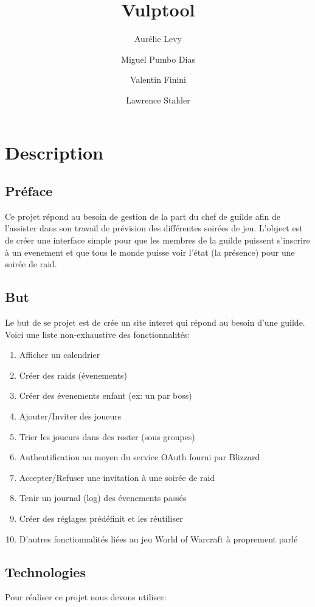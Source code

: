 \documentclass[a4paper, 11pt]{article}
\title{Vulptool}
\author{Aurélie Levy \and Miguel Pumbo Dias \and Valentin Finini \and Lawrence Stalder}
\begin{document}
\maketitle

\section{Description}
\subsection{Préface}
Ce projet répond au besoin de gestion de la part du chef de guilde afin de l'assister dans son travail de prévision des différentes soirées de jeu. L'object est de créer une interface simple pour que les membres de la guilde puissent s'inscrire à un evenement et que tous le monde puisse voir l'état (la présence) pour une soirée de raid.

\subsection{But}
Le but de se projet est de crée un site interet qui répond au besoin d'une guilde. Voici une liste non-exhaustive des fonctionnalités:

	\begin{enumerate}
		\item Afficher un calendrier
		\item Créer des raids (évenements)
		\item Créer des évenements enfant (ex: un par boss)
		\item Ajouter/Inviter des joueurs
		\item Trier les joueurs dans des roster (sous groupes)
		\item Authentification au moyen du service OAuth fourni par Blizzard
		\item Accepter/Refuser une invitation à une soirée de raid
		\item Tenir un journal (log) des évenements passés
		\item Créer des réglages prédéfinit et les réutiliser
		\item D'autres fonctionnalités liées au jeu World of Warcraft à proprement parlé
	\end{enumerate}

\subsection{Technologies}
Pour réaliser ce projet nous devons utiliser:
	
\end{document}

